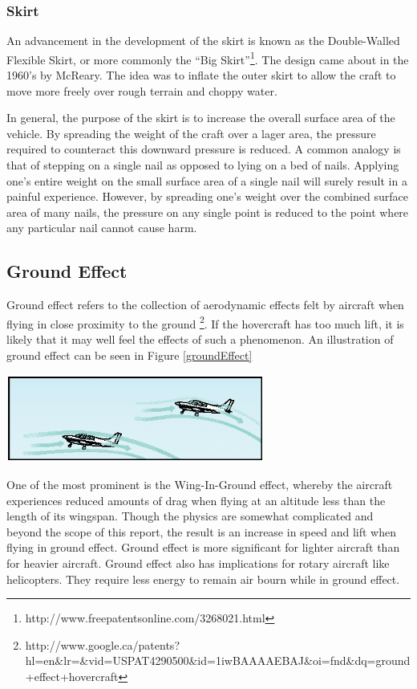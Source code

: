 \subsubsection{Skirt}
An advancement in the development of the skirt is known as the Double-Walled Flexible Skirt, or more commonly the “Big Skirt”\footnote{http://www.freepatentsonline.com/3268021.html}. The design came about in the 1960’s by McReary. The idea was to inflate the outer skirt to allow the craft to move more freely over rough terrain and choppy water.

In general, the purpose of the skirt is to increase the overall surface area of the vehicle. By spreading the weight of the craft over a lager area, the pressure required to counteract this downward pressure is reduced. A common analogy is that of stepping on a single nail as opposed to lying on a bed of nails. Applying one’s entire weight on the small surface area of a single nail will surely result in a painful experience. However, by spreading one’s weight over the combined surface area of many nails, the pressure on any single point is reduced to the point where any particular nail cannot cause harm.

\subsection{Ground Effect}
Ground effect refers to the collection of aerodynamic effects felt by aircraft when flying in close proximity to the ground \footnote{http://www.google.ca/patents?hl=en\&lr=\&vid=USPAT4290500\&id=1iwBAAAAEBAJ\&oi=fnd\&dq=ground+effect+hovercraft}. If the hovercraft has too much lift, it is likely that it may well feel the effects of such a phenomenon.  An illustration of ground effect can be seen in Figure \ref{groundEffect}


  \begin{center}
    \includegraphics[width=85mm]{imageSources/groundEffect.png}
  \end{center}
  \label{groundEffect}

One of the most prominent is the Wing-In-Ground effect, whereby the aircraft experiences reduced amounts of drag when flying at an altitude less than the length of its wingspan. Though the physics are somewhat complicated and beyond the scope of this report, the result is an increase in speed and lift when flying in ground effect. Ground effect is more significant for lighter aircraft than for heavier aircraft. Ground effect also has implications for rotary aircraft like helicopters. They require less energy to remain air bourn while in ground effect.

